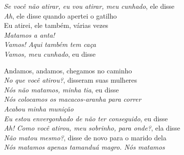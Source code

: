   \textit{Se você não atirar, eu vou atirar, meu cunhado}, ele disse\\
  \textit{Ah}, ele disse quando apertei o gatilho\\
  Eu atirei, ele também, várias vezes\\
  \textit{Matamos a anta!}\\
  \textit{Vamos! Aqui também tem caça}\\
  \textit{Vamos, meu cunhado}, eu disse
 
 \smallskip
 \begin{center}\end{center}
 \smallskip
 
\noindent   Andamos, andamos, chegamos no caminho\\
  \textit{No que você atirou?}, disseram suas mulheres\\
  \textit{Nós não matamos, minha tia}, eu disse\\
  \textit{Nós colocamos os macacos-aranha para correr}\\
  \textit{Acabou minha munição}\\
  \textit{Eu estou envergonhado de não ter conseguido}, eu disse\\
  \textit{Ah! Como você atirou, meu sobrinho, para onde?}, ela disse\\
  \textit{Não matou mesmo?}, disse de novo para o marido dela\\
  \textit{Nós matamos apenas tamanduá magro. Nós matamos}
 
